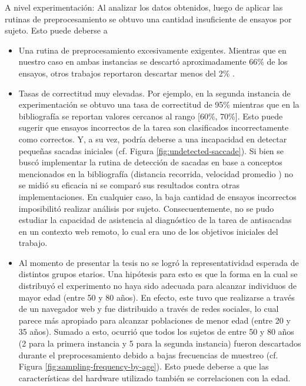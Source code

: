 A nivel experimentación: Al analizar los datos obtenidos, luego de aplicar las
rutinas de preprocesamiento se obtuvo una cantidad insuficiente de ensayos por
sujeto.
Esto puede deberse a 
\begin{itemize}
  \item Una rutina de preprocesamiento excesivamente exigentes.
  Mientras que en nuestro caso en ambas instancias se descartó aproximadamente
66\% de los ensayos, otros trabajos reportaron descartar menos del 2\%
\cite{unsworth_2011_distribution_analysis}. 

  \item Tasas de correctitud muy elevadas.
  Por ejemplo, en la segunda instancia de experimentación se obtuvo una tasa de
correctitud de 95\% mientras que en la bibliografía se reportan valores
cercanos al rango [60\%, 70\%].
  Esto puede sugerir que ensayos incorrectos de la tarea son clasificados
incorrectamente como correctos.
  Y, a su vez, podría deberse a una incapacidad en detectar pequeñas sacadas
iniciales (cf. Figura \ref{fig:undetected-saccade}).
  Si bien se buscó implementar la rutina de detección de sacadas en base a
conceptos mencionados en la bibliografía (distancia recorrida, velocidad
promedio \cite{stuart_2019_saccade_detection_algorithms}) no se midió su
eficacia ni se comparó sus resultados contra otras implementaciones.
  En cualquier caso, la baja cantidad de ensayos incorrectos imposibilitó
realizar análisis por sujeto.
  Consecuentemente, no se pudo estudiar la capacidad de asistencia al
diagnóstico de la tarea de antisacadas en un contexto web remoto, lo cual era
uno de los objetivos iniciales del trabajo.

  \item Al momento de presentar la tesis no se logró la representatividad
esperada de distintos grupos etarios.
  Una hipótesis para esto es que la forma en la cual se distribuyó el
experimento no haya sido adecuada para alcanzar individuos de mayor edad (entre
50 y 80 años).
  En efecto, este tuvo que realizarse a través de un navegador web y fue
distribuido a través de redes sociales, lo cual parece más apropiado para
alcanzar poblaciones de menor edad (entre 20 y 35 años).
  Sumado a esto, ocurrió que todos los sujetos de entre 50 y 80 años (2 para la
primera instancia y 5 para la segunda instancia) fueron descartados durante el
preprocesamiento debido a bajas frecuencias de muestreo (cf. Figura
\ref{fig:sampling-frequency-by-age}).
  Esto puede deberse a que las características del hardware utilizado también
se correlacionen con la edad.

\end{itemize}

